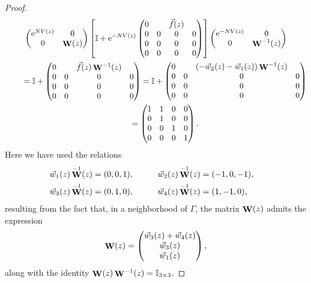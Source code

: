 \documentclass[pdftex]{sigma}
\DeclareMathOperator{\WW}{{\bf W}}
\numberwithin{equation}{section}
\begin{document}
\begin{proof}
 \begin{gather*}
 \begin{pmatrix}
 {\rm e}^{NV(z)} & 0 \\
 0 & \WW(z)
 \end{pmatrix}
 \left[
 \mathbb{I} + {\rm e}^{-NV(z)}
 \begin{pmatrix}
 0 & & \vec{f}(z) & \\
 0 & 0 & 0 & 0 \\
 0 & 0 & 0 & 0 \\
 0 & 0 & 0 & 0
 \end{pmatrix}\right]
 \begin{pmatrix}
 {\rm e}^{-NV(z)} & 0 \\
 0 & \WW^{-1}(z)
 \end{pmatrix}\\
 \qquad{}= \mathbb{I} +
 \begin{pmatrix}
 0 & & \vec{f}(z)\WW^{-1}(z) & \\
 0 & 0 & 0 & 0 \\
 0 & 0 & 0 & 0 \\
 0 & 0 & 0 & 0
 \end{pmatrix} = \mathbb{I} +
 \begin{pmatrix}
 0 & & (-\vec{w}_2(z) - \vec{w}_1(z))\WW^{-1}(z) & \\
 0 & 0 & 0 & 0 \\
 0 & 0 & 0 & 0 \\
 0 & 0 & 0 & 0
 \end{pmatrix} \\
 \qquad{}=
 \begin{pmatrix}
 1 & 1 & 0 & 0\\
 0 & 1 & 0 & 0 \\
 0 & 0 & 1 & 0 \\
 0 & 0 & 0 & 1
 \end{pmatrix}.
 \end{gather*}
 Here we have used the relations
 \begin{alignat*}{3}
 &\vec{w}_1(z)\WW^{-1}(z) = (0,0,1), \qquad&& \vec{w}_2(z)\WW^{-1}(z) = (-1,0,-1),&\\
 &\vec{w}_3(z)\WW^{-1}(z) = (0,1,0), \qquad&& \vec{w}_4(z)\WW^{-1}(z) = (1,-1,0),&
 \end{alignat*}
 resulting from the fact that, in a neighborhood of $\Gamma$, the matrix $\WW(z)$ admits the expression
 \begin{equation*}
 \WW(z) =
 \begin{pmatrix}
 \vec{w}_3(z) + \vec{w}_4(z) \\
 \vec{w}_3(z) \\
 \vec{w}_1(z)
 \end{pmatrix},
 \end{equation*}
 along with the identity $\WW(z) \WW^{-1}(z) = \mathbb{I}_{3\times 3}$.
\end{proof}
\end{document}
